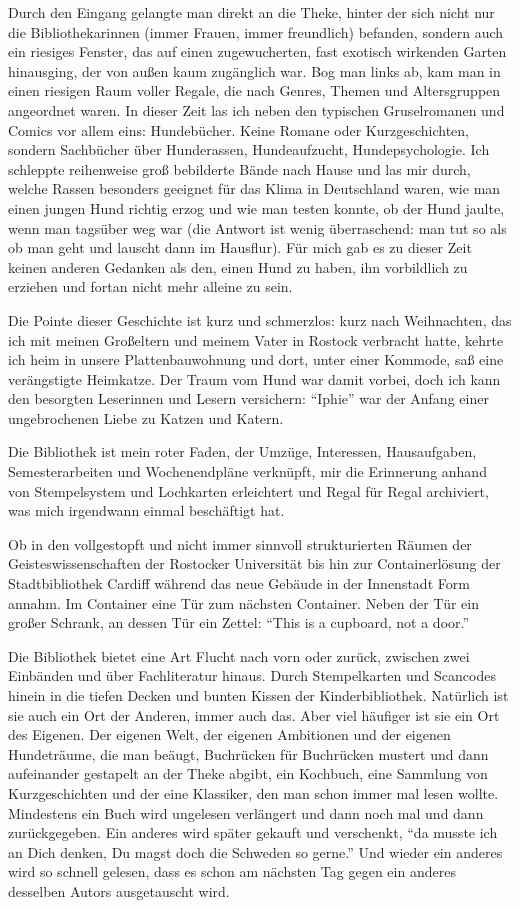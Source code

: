 \documentclass[a4paper,
fontsize=11pt,
oneside,
numbers=noperiodatend,
parskip=half-,
bibliography=totoc,
final
]{scrartcl}
\begin{document}
Durch den Eingang gelangte man direkt an die Theke, hinter der sich
nicht nur die Bibliothekarinnen (immer Frauen, immer freundlich)
befanden, sondern auch ein riesiges Fenster, das auf einen
zugewucherten, fast exotisch wirkenden Garten hinausging, der von außen
kaum zugänglich war. Bog man links ab, kam man in einen riesigen Raum
voller Regale, die nach Genres, Themen und Altersgruppen angeordnet
waren. In dieser Zeit las ich neben den typischen Gruselromanen und
Comics vor allem eins: Hundebücher. Keine Romane oder Kurzgeschichten,
sondern Sachbücher über Hunderassen, Hundeaufzucht, Hundepsychologie.
Ich schleppte reihenweise groß bebilderte Bände nach Hause und las mir
durch, welche Rassen besonders geeignet für das Klima in Deutschland
waren, wie man einen jungen Hund richtig erzog und wie man testen
konnte, ob der Hund jaulte, wenn man tagsüber weg war (die Antwort ist
wenig überraschend: man tut so als ob man geht und lauscht dann im
Hausflur). Für mich gab es zu dieser Zeit keinen anderen Gedanken als
den, einen Hund zu haben, ihn vorbildlich zu erziehen und fortan nicht
mehr alleine zu sein.

Die Pointe dieser Geschichte ist kurz und schmerzlos: kurz nach
Weihnachten, das ich mit meinen Großeltern und meinem Vater in Rostock
verbracht hatte, kehrte ich heim in unsere Plattenbauwohnung und dort,
unter einer Kommode, saß eine verängstigte Heimkatze. Der Traum vom Hund
war damit vorbei, doch ich kann den besorgten Leserinnen und Lesern
versichern: \enquote{Iphie} war der Anfang einer ungebrochenen Liebe zu
Katzen und Katern.

Die Bibliothek ist mein roter Faden, der Umzüge, Interessen,
Hausaufgaben, Semesterarbeiten und Wochenendpläne verknüpft, mir die
Erinnerung anhand von Stempelsystem und Lochkarten erleichtert und Regal
für Regal archiviert, was mich irgendwann einmal beschäftigt hat.

Ob in den vollgestopft und nicht immer sinnvoll strukturierten Räumen
der Geisteswissenschaften der Rostocker Universität bis hin zur
Containerlösung der Stadtbibliothek Cardiff während das neue Gebäude in
der Innenstadt Form annahm. Im Container eine Tür zum nächsten
Container. Neben der Tür ein großer Schrank, an dessen Tür ein Zettel:
\enquote{This is a cupboard, not a door.}

Die Bibliothek bietet eine Art Flucht nach vorn oder zurück, zwischen
zwei Einbänden und über Fachliteratur hinaus. Durch Stempelkarten und
Scancodes hinein in die tiefen Decken und bunten Kissen der
Kinderbibliothek. Natürlich ist sie auch ein Ort der Anderen, immer auch
das. Aber viel häufiger ist sie ein Ort des Eigenen. Der eigenen Welt,
der eigenen Ambitionen und der eigenen Hundeträume, die man beäugt,
Buchrücken für Buchrücken mustert und dann aufeinander gestapelt an der
Theke abgibt, ein Kochbuch, eine Sammlung von Kurzgeschichten und der
eine Klassiker, den man schon immer mal lesen wollte. Mindestens ein
Buch wird ungelesen verlängert und dann noch mal und dann zurückgegeben.
Ein anderes wird später gekauft und verschenkt, \enquote{da musste ich
an Dich denken, Du magst doch die Schweden so gerne.} Und wieder ein
anderes wird so schnell gelesen, dass es schon am nächsten Tag gegen ein
anderes desselben Autors ausgetauscht wird.
\end{document}
